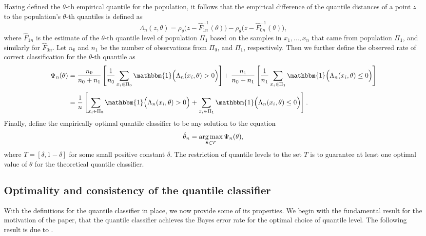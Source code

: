 Having defined the $\theta$-th empirical quantile for the population, it follows
that the empirical difference of the quantile distances of a point $z$ to the
population's $\theta$-th quantiles is defined as
\[
  \Lambda_n (z, \theta) = \rho_{\theta}\Big(z - \hat{F}_{1n}^{-1}(\theta)\Big) -
  \rho_{\theta}\Big(z - \hat{F}_{0n}^{-1}(\theta)\Big),
\]
where $\hat{F}_{1n}$ is the estimate of the $\theta$-th quantile level of
population $\Pi_1$ based on the samples in $x_1, \dots, x_n$ that came from
population $\Pi_1$, and similarly for $\hat{F}_{0n}$.  Let $n_0$ and $n_1$
be the number of observations from $\Pi_0$, and $\Pi_1$, respectively.  Then we
further define the observed rate of correct classification for the $\theta$-th
quantile as
\begin{align}
  \begin{split}
    \Psi_n(\theta)
    &= \frac{n_0}{n_0 + n_1} \left[
      \frac{1}{n_0} \sum_{x_i \in \Pi_0}
      \mathbbm{1}\Big( \Lambda_n(x_i, \theta) > 0 \Big)
    \right] +
      \frac{n_1}{n_0 + n_1} \left[
        \frac{1}{n_1} \sum_{x_i \in \Pi_1}
        \mathbbm{1}\Big( \Lambda_n(x_i, \theta) \leq 0 \Big)
      \right] \\[1ex]
    &= \frac{1}{n} \left[
      \sum_{x_i \in \Pi_0} \mathbbm{1}\Big( \Lambda_n(x_i, \theta) > 0 \Big) +
      \sum_{x_i \in \Pi_1} \mathbbm{1}\Big( \Lambda_n(x_i, \theta) \leq 0 \Big)
    \right].
  \end{split}
\end{align}
Finally, define the empirically optimal quantile classifier to be any solution
to the equation
\begin{equation}
  \label{eq:theta-hat}
  \hat{\theta}_n = \operatorname*{arg\,max}_{\theta \in T} \Psi_n(\theta),
\end{equation}
where $T = [\delta, 1 - \delta]$ for some small positive constant $\delta$.  The
restriction of quantile levels to the set $T$ is to guarantee at least one
optimal value of $\theta$ for the theoretical quantile classifier.




\subsection{Optimality and consistency of the quantile classifier}
\label{sec:quantile-classifier-optimality}

With the definitions for the quantile classifier in place, we now provide some
of its properties.  We begin with the fundamental result for the motivation of
the paper, that the quantile classifier achieves the Bayes error rate for the
optimal choice of quantile level.  The following result is due to
\cite{hennig2016}.

